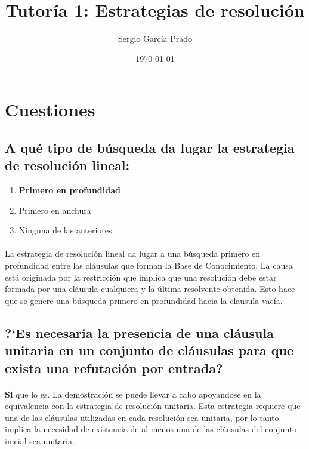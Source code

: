 \documentclass[10pt, a4paper,spanish]{article}
\title{\vspace{-15mm}\fontsize{24pt}{10pt}\selectfont\textbf{Tutoría 1: Estrategias de resolución}} %
\author{Sergio García Prado}
\date{\today}
\begin{document}
	\maketitle %

	\thispagestyle{fancy} %



	\section{Cuestiones}

		\subsection{A qué tipo de búsqueda da lugar la estrategia de resolución lineal:}

			\begin{enumerate}[label=\Alph*)]
				\item \textbf{Primero en profundidad}
				\item Primero en anchura
				\item Ninguna de las anteriores
			\end{enumerate}

			\paragraph{}
			La estrategia de resolución lineal da lugar a una búsqueda primero en profundidad entre las cláusulas que forman la Base de Conocimiento. La causa está originada por la restricción que implica que una resolución debe estar formada por una cláusula cualquiera y la última resolvente obtenida. Esto hace que se genere una búsqueda primero en profundidad hacia la clausula vacía.


		\subsection{?`Es necesaria la presencia de una cláusula unitaria en un conjunto de cláusulas para que exista una refutación por entrada?}

			\paragraph{}
			\textbf{Si} que lo es. La demostración se puede llevar a cabo apoyandose en la equivalencia con la estrategia de resolución unitaria. Esta estrategia requiere que una de las cláusulas utilizadas en cada resolución sea unitaria, por lo tanto implica la necesidad de existencia de al menos una de las cláusulas del conjunto inicial sea unitaria.
\end{document}

